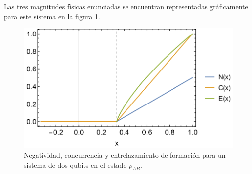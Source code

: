 \documentclass{scrartcl}
\DeclareRobustCommand{\[}{\begin{equation}}
\DeclareRobustCommand{\]}{\end{equation}}
\begin{document}
\begin{enumerate}
\begin{enumerate}
        Las tres magnitudes físicas enunciadas se encuentran representadas gráficamente para este sistema en la figura \ref{fig:II_2_e}.
        
        \begin{figure}[t]
            \centering
            \includegraphics[width=.5\linewidth]{Images/II_2_e-Entanglement.pdf}
            \caption{Negatividad, concurrencia y entrelazamiento de formación para un sistema de dos qubits en el estado $\rho_{AB}$.}
            \label{fig:II_2_e}
        \end{figure}
        
    \end{enumerate}
    
\end{enumerate}
\end{document}
